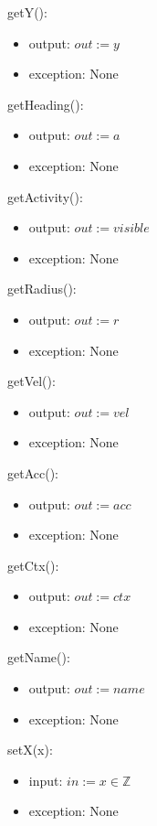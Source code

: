 \documentclass[12pt]{article}
\begin{document}
\noindent getY():
\begin{itemize}
    \item output: $out := y$
    \item exception: None
\end{itemize}

\noindent getHeading():
\begin{itemize}
    \item output: $out := a$
    \item exception: None
\end{itemize}

\noindent getActivity():
\begin{itemize}
    \item output: $out := visible$
    \item exception: None
\end{itemize}

\noindent getRadius():
\begin{itemize}
    \item output: $out := r$
    \item exception: None
\end{itemize}

\noindent getVel():
\begin{itemize}
    \item output: $out := vel$
    \item exception: None
\end{itemize}

\noindent getAcc():
\begin{itemize}
    \item output: $out := acc$
    \item exception: None
\end{itemize}

\noindent getCtx():
\begin{itemize}
    \item output: $out := ctx$
    \item exception: None
\end{itemize}

\noindent getName():
\begin{itemize}
    \item output: $out := name$
    \item exception: None
\end{itemize}

\noindent setX(x):
\begin{itemize}
    \item input: $in := x \in \mathbb{Z}$
    \item exception: None
\end{itemize}
\end{document}
